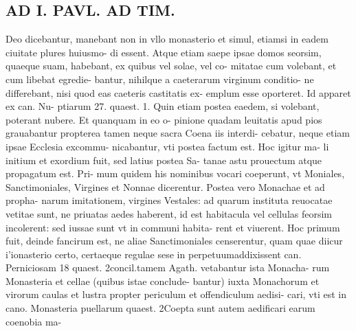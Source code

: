 \documentclass{article}
\begin{document}
\begin{pages}
\section*{AD I. PAVL. AD TIM. }
\marginpar{[ p.292 ]}\pstart Deo dicebantur, manebant non in vllo monasterio et simul, etiamsi in eadem ciuitate plures huiusmo- di essent. Atque etiam saepe ipsae domos seorsim, quaeque suam, habebant, ex quibus vel solae, vel co- mitatae cum volebant, et cum libebat egredie- bantur, nihilque a caeterarum virginum conditio- ne differebant, nisi quod eas caeteris castitatis ex- emplum esse oporteret. Id apparet ex can. Nu- ptiarum 27. quaest. 1. Quin etiam postea eaedem, si volebant, poterant nubere. Et quanquam in eo o- pinione quadam leuitatis apud pios grauabantur propterea tamen neque sacra Coena iis interdi- cebatur, neque etiam ipsae Ecclesia excommu- nicabantur, vti postea factum est. Hoc igitur ma- li initium et exordium fuit, sed latius postea Sa- tanae astu prouectum atque propagatum est. Pri- mum quidem his nominibus vocari coeperunt, vt Moniales, Sanctimoniales, Virgines et Nonnae dicerentur. Postea vero Monachae et ad propha- narum imitationem, virgines Vestales: ad quarum instituta reuocatae vetitae sunt, ne priuatas aedes haberent, id est habitacula vel cellulas feorsim incolerent: sed iussae sunt vt in communi habita- rent et viuerent. Hoc primum fuit, deinde fancirum est, ne aliae Sanctimoniales censerentur, quam quae diicur i'ionasterio certo, certaeque regulae sese in perpetuumaddixissent can. Perniciosam 18 quaest. 2concil.tamem Agath. vetabantur ista Monacha- rum Monasteria et cellae (quibus istae conclude- bantur) iuxta Monachorum et virorum caulas et lustra propter periculum et offendiculum aedisi- cari, vti est in cano. Monasteria puellarum quaest. 2Coepta sunt autem aedificari earum coenobia ma-  \pend

\end{pages}
\end{document}
